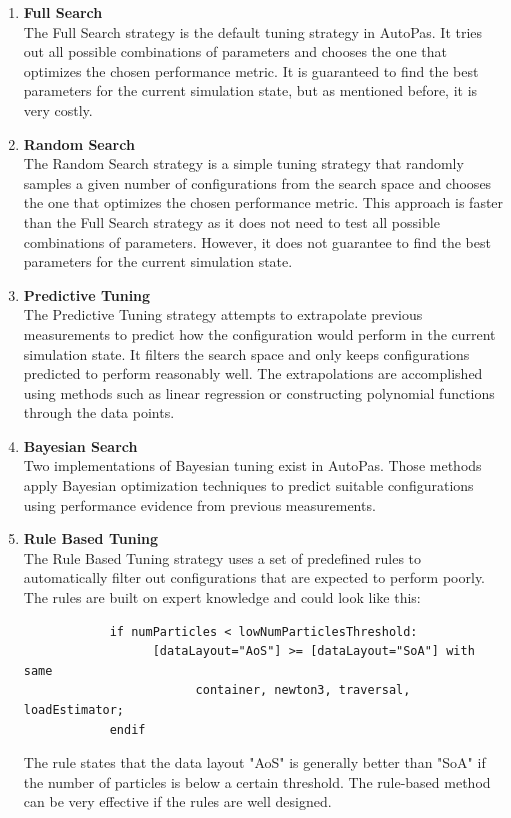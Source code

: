 \begin{enumerate}
      \item \textbf{Full Search} \\
            The Full Search strategy is the default tuning strategy in AutoPas. It tries out all possible combinations of parameters and chooses the one that optimizes the chosen performance metric. It is guaranteed to find the best parameters for the current simulation state, but as mentioned before, it is very costly.

      \item \textbf{Random Search} \\
            The Random Search strategy is a simple tuning strategy that randomly samples a given number of configurations from the search space and chooses the one that optimizes the chosen performance metric. This approach is faster than the Full Search strategy as it does not need to test all possible combinations of parameters. However, it does not guarantee to find the best parameters for the current simulation state.

      \item \textbf{Predictive Tuning} \\
            The Predictive Tuning strategy attempts to extrapolate previous measurements to predict how the configuration would perform in the current simulation state. It filters the search space and only keeps configurations predicted to perform reasonably well. The extrapolations are accomplished using methods such as linear regression or constructing polynomial functions through the data points.

      \item \textbf{Bayesian Search} \\
            Two implementations of Bayesian tuning exist in AutoPas. Those methods apply Bayesian optimization techniques to predict suitable configurations using performance evidence from previous measurements.

      \item \textbf{Rule Based Tuning} \\
            The Rule Based Tuning strategy uses a set of predefined rules to automatically filter out configurations that are expected to perform poorly. The rules are built on expert knowledge and could look like this:
            \begin{small}
                  \begin{verbatim}
            if numParticles < lowNumParticlesThreshold:
                  [dataLayout="AoS"] >= [dataLayout="SoA"] with same 
                        container, newton3, traversal, loadEstimator;
            endif
            \end{verbatim}
            \end{small}
            The rule states that the data layout "AoS" is generally better than "SoA" if the number of particles is below a certain threshold. The rule-based method can be very effective if the rules are well designed.
\end{enumerate}


